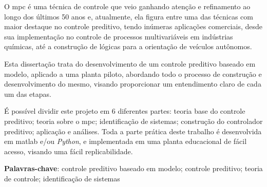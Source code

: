 \setlength{\absparsep}{18pt} %
\begin{resumo}
    O \acrshort{mpc} é uma técnica de controle que veio ganhando atenção e refinamento
    ao longo dos últimos 50 anos e, atualmente, ela figura entre uma das técnicas
    com maior destaque no controle preditivo, tendo inúmeras aplicações comerciais,
    desde sua implementação no controle de processos multivariáveis em indústrias químicas,
    até a construção de lógicas para a orientação de veículos autônomos.

    Esta dissertação trata do desenvolvimento de um controle preditivo baseado em modelo,
    aplicado a uma planta piloto, abordando todo o processo de construção e desenvolvimento
    do mesmo, visando proporcionar um entendimento claro de cada um das etapas.

    É possível dividir este projeto em 6 diferentes partes: teoria base do controle
    preditivo; teoria sobre o \acrshort{mpc}; identificação de sistemas; construção do
    controlador preditivo; aplicação e análises. Toda a parte prática deste trabalho é
    desenvolvida em \acrshort{matlab} e/ou \textit{Python}, e implementada em uma
    planta educacional de fácil acesso, visando uma fácil replicabilidade.
    
    \vspace{\onelineskip}

    \noindent 
    \textbf{Palavras-chave}: controle preditivo baseado em modelo; controle preditivo; teoria de controle; identificação de sistemas
\end{resumo}